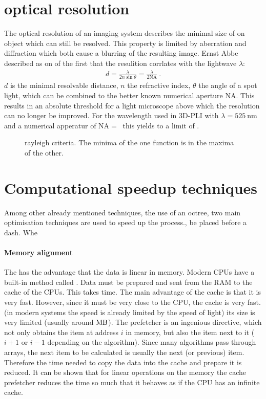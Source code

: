 \section{optical resolution}
\label{sec:opticalResolution}
% 
The optical resolution of an imaging system describes the minimal size of on object which can still be resolved.
This property is limited by aberration and diffraction which both cause a blurring of the resulting image.
Ernst Abbe described as on of the first that the resulition corrlates with the lightwave $\lambda$: 
\begin{align}
d=\frac{ \lambda}{2 n \sin \theta} = \frac{\lambda}{2\mathrm{NA}} \> .
\end{align}
$d$ is the minimal resolvable distance, $n$ the refractive index, $\theta$ the angle of a spot light, which can be combined to the better known numerical aperture $\mathrm{NA}$.
This results in an absolute threshold for a light microscope above which the resolution can no longer be improved.
For the wavelength used in \ac{3D-PLI} with $\lambda = \SI{525}{\nano\meter}$ and a numerical apperatur of $\mathrm{NA} = \SI{}{}$ this yields to a limit of \dummy{}.
% 
\begin{figure}[!t]
\setlength{\tikzwidth}{0.45\textwidth}
\centering
\caption[Raylay criterium]{rayleigh criteria. The minima of the one function is in the maxima of the other.}
\label{fig:rayleigh}
\end{figure}
% 
% 
% 
% 
\section{Computational speedup techniques}
% 
Among other already mentioned techniques, \eg{} the use of an octree, two main optimisation techniques are used to speed up the process., be placed before a dash. Whe
% 
\paragraph{Memory alignment}
The  has the advantage that the data is linear in memory.
Modern \acp{CPU} have a built-in method called .
Data must be prepared and sent from the \ac{RAM} to the cache of the \acp{CPU}.
This takes time.
The main advantage of the cache is that it is very fast.
However, since it must be very close to the \ac{CPU}, the cache is very fast. (in modern systems the speed is already limited by the speed of light) its size is very limited (usually around $\si{\mega\byte}$).
The prefetcher is an ingenious directive, which not only obtains the item at address $i$ in memory, but also the item next to it ($i+1$ or $i-1$ depending on the algorithm).
Since many algorithms pass through arrays, the next item to be calculated is usually the next (or previous) item.
Therefore the time needed to copy the data into the cache and prepare it is reduced.
It can be shown that for linear operations on the memory the cache prefetcher reduces the time so much that it behaves as if the \ac{CPU} has an infinite cache.
% 
